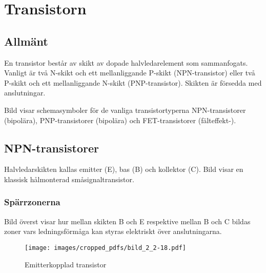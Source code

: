 \newpage
\section{Transistorn}
\label{transistorn}


\subsection{Allmänt}
\label{transistor_allmänt}

En transistor består av skikt av dopade halvledarelement som sammanfogats.
Vanligt är två N-skikt och ett mellanliggande P-skikt (NPN-transistor) eller två
P-skikt och ett mellanliggande N-skikt (PNP-transistor).
Skikten är försedda med anslutningar.

Bild  visar schemasymboler för de vanliga tran\-sistor\-typerna 
NPN-transistorer (bipolära), PNP-\-tran\-sistorer (bipolära) och
FET-transistorer (fälteffekt-).

\newpage
\subsection{NPN-transistorer}

Halvledarskikten kallas emitter (E), bas (B) och kollektor (C).
Bild  visar en klassisk hålmonterad småsignaltransistor.



\subsubsection{Spärrzonerna}


Bild  överst visar hur mellan skikten B och E respektive
mellan B och C bildas zoner vars ledningsförmåga kan styras elektriskt över
anslutningarna.

\begin{figure*}[p]
  \begin{center}
    \texttt{[image: images/cropped\_pdfs/bild\_2\_2-18.pdf]}
    \caption{Emitterkopplad transistor}
    \label{fig:BildII2-18}
  \end{center}
\end{figure*}

